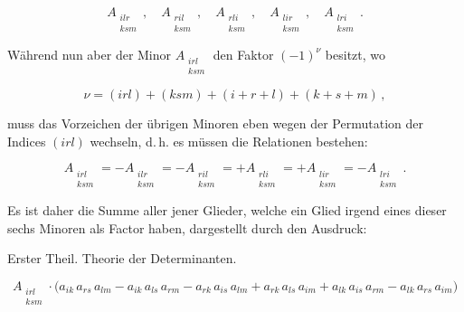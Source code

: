 \documentclass[11pt]{article}
\providecommand{\weberpage}[1]{}
\begin{document}
\[
A_{\substack{ilr\\ksm}}\,,\quad A_{\substack{ril\\ksm}}\,,\quad A_{\substack{rli\\ksm}}\,,\quad
A_{\substack{lir\\ksm}}\,,\quad A_{\substack{lri\\ksm}}\,.
\]

W\"ahrend nun aber der Minor $A_{\substack{irl\\ksm}}$ den Faktor $(-1)^\nu$ besitzt, wo

\[
\nu = (irl)+(ksm)+(i+r+l)+(k+s+m)\,,
\]

muss das Vorzeichen der \"ubrigen Minoren eben wegen der Permutation der Indices $(irl)$
wechseln, d.\,h. es m\"ussen die Relationen bestehen:

\[
A_{\substack{irl\\ksm}} = -A_{\substack{ilr\\ksm}} = -A_{\substack{ril\\ksm}} =
+A_{\substack{rli\\ksm}} = +A_{\substack{lir\\ksm}} = -A_{\substack{lri\\ksm}}\,.
\]

Es ist daher die Summe aller jener Glieder, welche ein Glied irgend eines dieser sechs Minoren
als Factor haben, dargestellt durch den Ausdruck:


\weberpage{56}
Erster Theil. Theorie der Determinanten.

\[
A_{\substack{irl\\ksm}} \cdot \bigl(
a_{ik}\,a_{rs}\,a_{lm} - a_{ik}\,a_{ls}\,a_{rm} - a_{rk}\,a_{is}\,a_{lm} + a_{rk}\,a_{ls}\,a_{im}
+ a_{lk}\,a_{is}\,a_{rm} - a_{lk}\,a_{rs}\,a_{im}
\bigr)
\]
\end{document}
